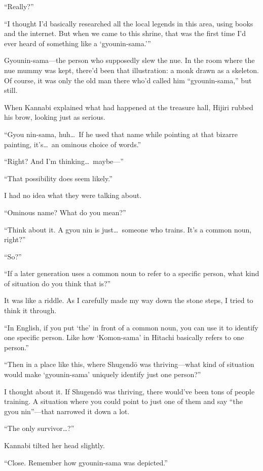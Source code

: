 \documentclass[
    a4paper,
    12pt,
    twoside,
    openany,
    UTF8,
    fontset=windows
]{ctexbook}
\begin{document}
``Really?''

``I thought I'd basically researched all the local legends in this area, using books and the internet. But when we came to this shrine, that was the first time I'd ever heard of something like a `gyounin-sama.'''

Gyounin-sama---the person who supposedly slew the nue. In the room where the nue mummy was kept, there'd been that illustration: a monk drawn as a skeleton. Of course, it was only the old man there who'd called him ``gyounin-sama,'' but still.

When Kannabi explained what had happened at the treasure hall, Hijiri rubbed his brow, looking just as serious.

``Gyou nin-sama, huh\dots\ If he used that name while pointing at that bizarre painting, it's\dots\ an ominous choice of words.''

``Right? And I'm thinking\dots\ maybe---''

``That possibility does seem likely.''

I had no idea what they were talking about.

``Ominous name? What do you mean?''

``Think about it. A gyou nin is just\dots\ someone who trains. It's a common noun, right?''

``So?''

``If a later generation uses a common noun to refer to a specific person, what kind of situation do you think that is?''

It was like a riddle. As I carefully made my way down the stone steps, I tried to think it through.

``In English, if you put `the' in front of a common noun, you can use it to identify one specific person. Like how `Komon-sama' in Hitachi basically refers to one person.''

``Then in a place like this, where Shugend\=o was thriving---what kind of situation would make `gyounin-sama' uniquely identify just one person?''

I thought about it. If Shugend\=o was thriving, there would've been tons of people training. A situation where you could point to just one of them and say ``the gyou nin''---that narrowed it down a lot.

``The only survivor\dots?''

Kannabi tilted her head slightly.

``Close. Remember how gyounin-sama was depicted.''
\end{document}

